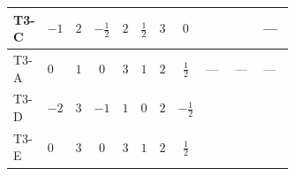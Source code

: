 \documentclass[8pt]{article}
\begin{document}
\begin{landscape}
\begin{longtable}{@{}llcccccc >{\raggedright\arraybackslash}p{0.21\linewidth} >{\raggedright\arraybackslash}p{0.21\linewidth} >{\raggedright\arraybackslash}p{0.21\linewidth}@{}}
\midrule
T3-C & $-1$ & $2$ & $-\frac{1}{2}$ & $2$ & $\frac{1}{2}$ & $3$ & $0$ & \scriptsize\adjustbox{max width=\linewidth}{$\begin{gathered} +8 {\lambda_{H1}} {\lambda_{H1}^{\rm Adj}}\end{gathered}$} & \scriptsize\adjustbox{max width=\linewidth}{$\begin{gathered} +2 {\lambda_{H1}^{\rm Adj}} {\lambda_{S_1}}\end{gathered}$} & --- \\
\midrule
T3-A & $0$ & $1$ & $0$ & $3$ & $1$ & $2$ & $\frac{1}{2}$ & --- & --- & --- \\
\midrule
T3-D & $-2$ & $3$ & $-1$ & $1$ & $0$ & $2$ & $-\frac{1}{2}$ & \scriptsize\adjustbox{max width=\linewidth}{$\begin{gathered} +8 {\lambda_{H1}} {\lambda_{H1}^{\rm Adj}}\end{gathered}$} & \scriptsize\adjustbox{max width=\linewidth}{$\begin{gathered} +2 {\lambda_{H1}^{\rm Adj}} {\lambda_{S_1}}\end{gathered}$} & \scriptsize\adjustbox{max width=\linewidth}{$\begin{gathered} {\lambda_{H1}^{\rm Adj}} (6 \operatorname{Tr}\!\left({Y_d}\,\left({Y_d}\right)^{\dagger}\right)+2 \operatorname{Tr}\!\left({Y_e}\,\left({Y_e}\right)^{\dagger}\right)+6 \operatorname{Tr}\!\left({Y_u}\,\left({Y_u}\right)^{\dagger}\right)+16 {\lambda_{S_1}^{\rm Adj}})\end{gathered}$} \\
\midrule
T3-E & $0$ & $3$ & $0$ & $3$ & $1$ & $2$ & $\frac{1}{2}$ & \scriptsize\adjustbox{max width=\linewidth}{$\begin{gathered} +8 {\lambda_{H1}} {\lambda_{H1}^{\rm Adj}}\end{gathered}$} & \scriptsize\adjustbox{max width=\linewidth}{$\begin{gathered} +2 {\lambda_{H1}^{\rm Adj}} {\lambda_{S_1}}\end{gathered}$} & \scriptsize\adjustbox{max width=\linewidth}{$\begin{gathered} {\lambda_{H1}^{\rm Adj}} (6 \operatorname{Tr}\!\left({Y_d}\,\left({Y_d}\right)^{\dagger}\right)+2 \operatorname{Tr}\!\left({Y_e}\,\left({Y_e}\right)^{\dagger}\right)+6 \operatorname{Tr}\!\left({Y_u}\,\left({Y_u}\right)^{\dagger}\right)+16 {\lambda_{S_1}^{\rm Adj}})\end{gathered}$} \\
\midrule
\bottomrule
\end{longtable}
\clearpage

\end{landscape}
\end{document}
